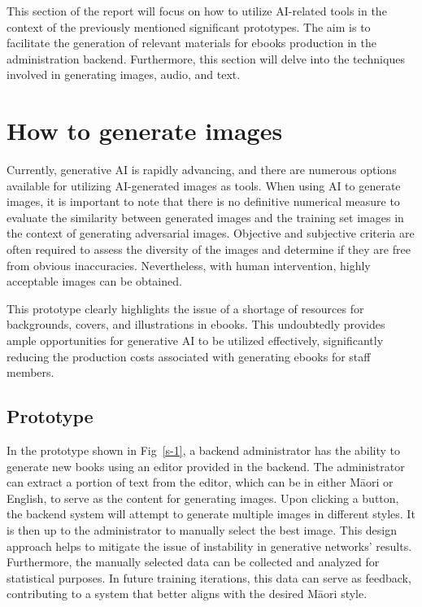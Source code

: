 This section of the report will focus on how to utilize AI-related tools in the context of the previously mentioned significant prototypes. 
The aim is to facilitate the generation of relevant materials for ebooks production in the administration backend. 
Furthermore, this section will delve into the techniques involved in generating images, audio, and text.

\section{How to generate images} 

Currently, generative AI is rapidly advancing, and there are numerous options available for utilizing AI-generated images as tools. 
When using AI to generate images, it is important to note that there is no definitive numerical measure to evaluate the similarity between generated images and the training set images in the context of generating adversarial images. 
Objective and subjective criteria are often required to assess the diversity of the images and determine if they are free from obvious inaccuracies. 
Nevertheless, with human intervention, highly acceptable images can be obtained. 

This prototype clearly highlights the issue of a shortage of resources for backgrounds, covers, and illustrations in ebooks. 
This undoubtedly provides ample opportunities for generative AI to be utilized effectively, significantly reducing the production costs associated with generating ebooks for staff members.

\subsection{Prototype}

In the prototype shown in Fig~\ref{s-1}, a backend administrator has the ability to generate new books using an editor provided in the backend. 
The administrator can extract a portion of text from the editor, which can be in either Māori or English, to serve as the content for generating images. 
Upon clicking a button, the backend system will attempt to generate multiple images in different styles. 
It is then up to the administrator to manually select the best image. 
This design approach helps to mitigate the issue of instability in generative networks' results. 
Furthermore, the manually selected data can be collected and analyzed for statistical purposes. 
In future training iterations, this data can serve as feedback, contributing to a system that better aligns with the desired Māori style.

